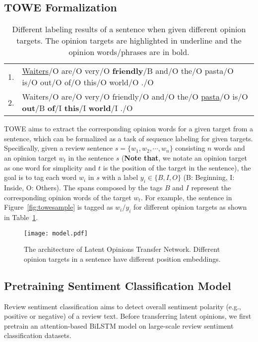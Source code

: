 \documentclass[letterpaper]{article} \usepackage{aaai20}  \usepackage{times}  \usepackage{helvet} \usepackage{courier}  \usepackage[hyphens]{url}  \usepackage{graphicx} \urlstyle{rm} \def\UrlFont{\rm}  \usepackage{graphicx}
\begin{document}
\subsection{TOWE Formalization}
\begin{table}[ht]
	\small
	\centering
	\caption{Different labeling results of a sentence when given different opinion targets. The opinion targets are highlighted in underline and the opinion words/phrases are in bold.}
	\label{taskdefinition}
	\begin{tabular}{c p{7.2cm}}
		\hline
		1. & \textrm{\underline{Waiters}/O are/O very/O \textbf{friendly}/B and/O the/O pasta/O is/O out/O of/O this/O world/O ./O} \\
		2. & \textrm{Waiters/O are/O very/O friendly/O and/O the/O \underline{pasta}/O is/O \textbf{out}/B \textbf{of}/I \textbf{this}/I \textbf{world}/I ./O} \\
		\hline
	\end{tabular}
\end{table}
TOWE aims to extract the corresponding opinion words for a given target from a sentence, which can be formalized as a task of sequence labeling for given targets. Specifically, given a review sentence $s=\{w_1, w_2, \cdots, w_n\}$ consisting $n$ words and an opinion target $w_t$  in the sentence $s$ (\textbf{Note that}, we notate an opinion target as one word for simplicity and $t$ is the position of the target in the sentence), the goal is to tag each word $w_i$ in $s$ with a label $y_i \in \{B, I, O \}$ (B: Beginning, I: Inside, O: Others). The spans composed by the tags $B$ and $I$ represent the corresponding opinion words of the target $w_t$. For example, the sentence in Figure~\ref{fig:towesample} is tagged as $w_i/y_i$ for different opinion targets as shown in Table~\ref{taskdefinition}.
\begin{figure*}[t]
	\centering
	\texttt{[image: model.pdf]}
	\caption{The architecture of Latent Opinions Transfer Network. Different opinion targets in a sentence have different position embeddings.}
	\label{fig:model}
\end{figure*}

\subsection{Pretraining Sentiment Classification Model}
Review sentiment classification aims to detect overall sentiment polarity (e.g., positive or negative) of a review text. Before transferring latent opinions, we first pretrain an attention-based BiLSTM model on large-scale review sentiment classification datasets.
\end{document}
